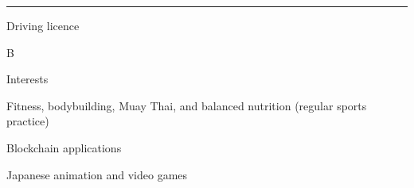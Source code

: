 \documentclass[a4paper,10pt]{article}
\newlength{\cvcolumngapwidth}
\newlength{\cvleftcolumnwidth}
\newlength{\cvrightcolumnwidth}
\newcommand{\cvsectionstyle}[1]{{\normalsize\cvsectionfont\textcolor{cvsectioncolor}{#1}}}
\newcommand{\cvheadingstyle}[1]{{\normalsize\cvheadingfont\textcolor{cvheadingcolor}{#1}}}
\newlength{\cvafteritemskipamount}
\newlength{\cvaftersectionskipamount}
\newlength{\cvbetweensectionandheadingextraskipamount}
\newlength{\cvparskip}
\newcommand{\cvsection}[1]{
    \begin{minipage}[t]{\cvleftcolumnwidth}
        \raggedleft\cvsectionstyle{#1}
    \end{minipage}%
    \hspace{\cvcolumngapwidth}%
    \begin{minipage}[t]{\cvrightcolumnwidth}
        \textcolor{cvrulecolor}{\rule{\cvrightcolumnwidth}{0.3mm}}
    \end{minipage}

    \vspace{\cvaftersectionskipamount}
}
\newcommand{\cvitem}[2]{
    \begin{minipage}[t]{\cvleftcolumnwidth}
        \raggedleft #1
    \end{minipage}%
    \hspace{\cvcolumngapwidth}%
    \begin{minipage}[t]{\cvrightcolumnwidth}
        \setlength{\parskip}{\cvparskip} #2
    \end{minipage}

    \vspace{\cvafteritemskipamount}
}
\begin{document}




\cvsection{ADDITIONAL INFORMATION}

\vspace{\cvbetweensectionandheadingextraskipamount}

\cvitem{
    \cvheadingstyle{Driving licence}
}{
    B
}

\cvitem{
    \cvheadingstyle{Interests}
}{
    Fitness, bodybuilding, Muay Thai, and balanced nutrition (regular sports practice) \par
    Blockchain applications \par
    Japanese animation and video games \par
}

\end{document}
